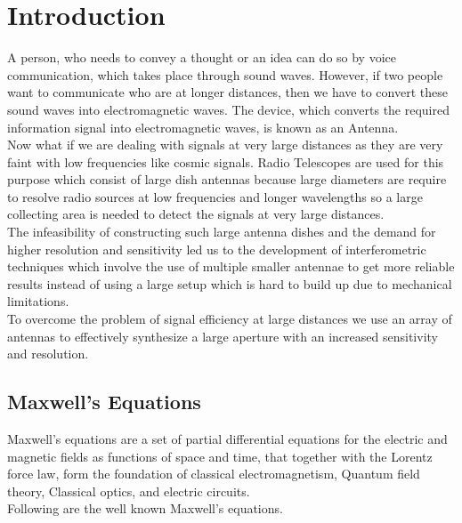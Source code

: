 \chapter{Introduction}

A person, who needs to convey a thought or an idea can do so by voice communication, which takes place through sound waves. However, if two people want to communicate who are at longer distances, then we have to convert these sound waves into electromagnetic waves. The device, which converts the required information signal into electromagnetic waves, is known as an Antenna.\\
Now what if we are dealing with signals at very large distances as they are very faint with low frequencies like cosmic signals. Radio Telescopes are used for this purpose which consist of large dish antennas because large diameters are require to resolve radio sources at low frequencies and longer wavelengths so a large collecting area is needed to detect the signals at very large distances.\\
The infeasibility of constructing such large antenna dishes and the demand for higher resolution and sensitivity led us to the development of interferometric techniques which involve the use of multiple smaller antennae to get more reliable results instead of using a large setup which is hard to build up due to mechanical limitations.\\
To overcome the problem of signal efficiency at large distances we use an array of antennas to effectively synthesize a large aperture with an increased sensitivity and resolution.
 

\section{Maxwell's Equations}

Maxwell’s equations are a set of partial differential equations for the electric and magnetic fields as functions of space and time, that together with the Lorentz force law, form the foundation of classical electromagnetism, Quantum field theory, Classical optics, and electric circuits.\\ 
Following are the well known Maxwell's equations.

